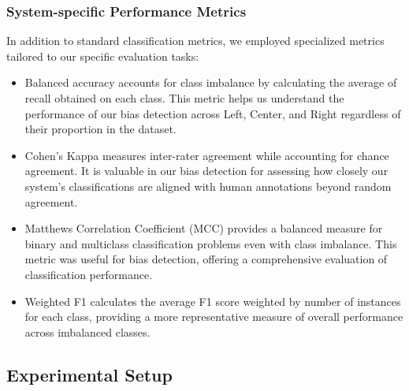 \documentclass[11pt]{article}
\begin{document}
\subsubsection{System-specific Performance Metrics}
In addition to standard classification metrics, we employed specialized metrics tailored to our specific evaluation tasks: 
\begin{itemize}
    \item Balanced accuracy accounts for class imbalance by calculating the average of recall obtained on each class. This metric helps us understand the performance of our bias detection across Left, Center, and Right regardless of their proportion in the dataset. 
    \item  Cohen’s Kappa measures inter-rater agreement while accounting for chance agreement. It is valuable in our bias detection for assessing how closely our system’s classifications are aligned with human annotations beyond random agreement. 
    \item Matthews Correlation Coefficient (MCC) provides a balanced measure for binary and multiclass classification problems even with class imbalance. This metric was useful for bias detection, offering a comprehensive evaluation of classification performance. 
    \item Weighted F1 calculates the average F1 score weighted by number of instances for each class, providing a more representative measure of overall performance across imbalanced classes.
\end{itemize}

\subsection{Experimental Setup}
\end{document}
